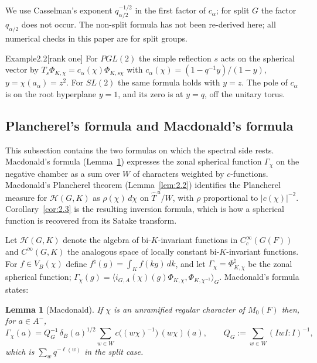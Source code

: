 \documentclass[12pt,letterpaper]{article}
\numberwithin{equation}{section}
\theoremstyle{plain}
\newtheorem{lemma}{Lemma}[section]
\theoremstyle{remark}
\theoremstyle{plain}
\theoremstyle{definition}
\theoremstyle{remark}
\theoremstyle{remark}
\newcommand{\Hc}{\mathcal{H}}
\newcommand{\ip}[1]{\langle #1\rangle}
\newcommand{\Thu}{\widehat{T}^{\,u}}
\begin{document}
\begin{rem26}\label{r:calpha}
We use Casselman's exponent $q_{\alpha/2}^{-1/2}$ in the first factor of $c_\alpha$; for split $G$ the factor $q_{\alpha/2}$ does not occur. The non-split formula has not been re-derived here; all numerical checks in this paper are for split groups.
\end{rem26}

\begin{fixedrem}{Example}{2.2}[rank one]\label{ex:2.2}
For $PGL(2)$ the simple reflection $s$ acts on the spherical vector by $T_s\Phi_{K,\chi}=c_\alpha(\chi)\Phi_{K,s\chi}$ with $c_\alpha(\chi)=(1-q^{-1}y)/(1-y)$, $y=\chi(a_\alpha)=z^2$. For $SL(2)$ the same formula holds with $y=z$. The pole of $c_\alpha$ is on the root hyperplane $y=1$, and its zero is at $y=q$, off the unitary torus.
\end{fixedrem}

\subsection{Plancherel's formula and Macdonald's formula}\label{sec:2.3}

This subsection contains the two formulas on which the spectral side rests. Macdonald's formula (Lemma~\ref{lem:2.1}) expresses the zonal spherical function $\Gamma_\chi$ on the negative chamber as a sum over $W$ of characters weighted by $c$-functions. Macdonald's Plancherel theorem (Lemma~\ref{lem:2.2}) identifies the Plancherel measure for $\Hc(G,K)$ as $\rho(\chi)\,d\chi$ on $\Thu/W$, with $\rho$ proportional to $|c(\chi)|^{-2}$. Corollary~\ref{cor:2.3} is the resulting inversion formula, which is how a spherical function is recovered from its Satake transform.


Let $\Hc(G,K)$ denote the algebra of bi-$K$-invariant functions in $C_c^\infty(G(F))$ and $C^\infty(G,K)$ the analogous space of locally constant bi-$K$-invariant functions. For $f\in V_B(\chi)$ define $f^\natural(g)=\int_Kf(kg)\,dk$, and let $\Gamma_\chi=\Phi_{K,\chi}^\natural$ be the zonal spherical function; $\Gamma_\chi(g)=\ip{i_{G,A}(\chi)(g)\Phi_{K,\chi},\Phi_{K,\chi^{-1}}}_G$. Macdonald's formula states:

\begin{lemma}[Macdonald]\label{lem:2.1}
If $\chi$ is an unramified regular character of $M_0(F)$ then, for $a\in A^-$,
\[
\Gamma_\chi(a)=Q_G^{-1}\,\delta_B(a)^{1/2}\sum_{w\in W}c\big((w\chi)^{-1}\big)\,(w\chi)(a),
\qquad
Q_G:=\sum_{w\in W}(IwI:I)^{-1},
\]
which is $\sum_{w}q^{-\ell(w)}$ in the split case.
\end{lemma}
\end{document}
